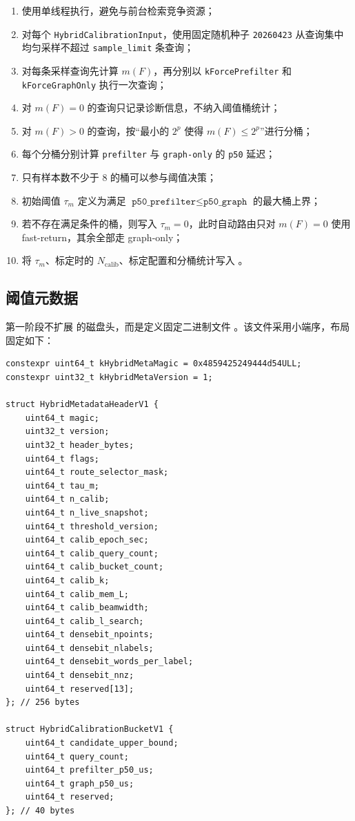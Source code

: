 \documentclass[UTF8]{ctexart}
\begin{document}
\begin{enumerate}
\item 使用单线程执行，避免与前台检索竞争资源；
\item 对每个 \texttt{HybridCalibrationInput}，使用固定随机种子 \texttt{20260423} 从查询集中均匀采样不超过 \texttt{sample\_limit} 条查询；
\item 对每条采样查询先计算 \(m(F)\)，再分别以 \texttt{kForcePrefilter} 和 \texttt{kForceGraphOnly} 执行一次查询；
\item 对 \(m(F)=0\) 的查询只记录诊断信息，不纳入阈值桶统计；
\item 对 \(m(F)>0\) 的查询，按“最小的 \(2^p\) 使得 \(m(F) \le 2^p\)”进行分桶；
\item 每个分桶分别计算 \texttt{prefilter} 与 \texttt{graph-only} 的 \texttt{p50} 延迟；
\item 只有样本数不少于 8 的桶可以参与阈值决策；
\item 初始阈值 \(\tau_m\) 定义为满足 \(\texttt{p50\_prefilter} \le \texttt{p50\_graph}\) 的最大桶上界；
\item 若不存在满足条件的桶，则写入 \(\tau_m = 0\)，此时自动路由只对 \(m(F)=0\) 使用 fast-return，其余全部走 graph-only；
\item 将 \(\tau_m\)、标定时的 \(N_{\text{calib}}\)、标定配置和分桶统计写入 。
\end{enumerate}

\subsection{阈值元数据}
第一阶段不扩展  的磁盘头，而是定义固定二进制文件 。该文件采用小端序，布局固定如下：

\begin{verbatim}
constexpr uint64_t kHybridMetaMagic = 0x4859425249444d54ULL;
constexpr uint32_t kHybridMetaVersion = 1;

struct HybridMetadataHeaderV1 {
	uint64_t magic;
	uint32_t version;
	uint32_t header_bytes;
	uint64_t flags;
	uint64_t route_selector_mask;
	uint64_t tau_m;
	uint64_t n_calib;
	uint64_t n_live_snapshot;
	uint64_t threshold_version;
	uint64_t calib_epoch_sec;
	uint64_t calib_query_count;
	uint64_t calib_bucket_count;
	uint64_t calib_k;
	uint64_t calib_mem_L;
	uint64_t calib_beamwidth;
	uint64_t calib_l_search;
	uint64_t densebit_npoints;
	uint64_t densebit_nlabels;
	uint64_t densebit_words_per_label;
	uint64_t densebit_nnz;
	uint64_t reserved[13];
}; // 256 bytes

struct HybridCalibrationBucketV1 {
	uint64_t candidate_upper_bound;
	uint64_t query_count;
	uint64_t prefilter_p50_us;
	uint64_t graph_p50_us;
	uint64_t reserved;
}; // 40 bytes
\end{verbatim}
\end{document}
